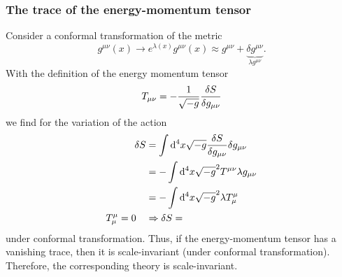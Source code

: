 \subsubsection{The trace of the energy-momentum tensor}
Consider a conformal transformation of the metric
\begin{equation}
	g^{\mu \nu}(x) \rightarrow e^{\lambda(x)} g^{\mu \nu}(x) \approx g^{\mu \nu} + \underbrace{\delta g^{\mu \nu}}_{\lambda g^{\mu\nu}}.
\end{equation}
With the definition of the energy momentum tensor
\begin{equation}
	T_{\mu \nu} = -  \frac{1}{\sqrt{-g}} \frac{\delta S}{\delta g_{\mu \nu}}
\end{equation}
we find for the variation of the action
\begin{align}
	\delta S &= \int \mathrm{d}^4 x \sqrt{-g} \frac{\delta S}{\delta g_{\mu \nu}} \delta g_{\mu \nu} \\
	&= - \int \mathrm{d}^4 x \sqrt{-g}^2 T^{\mu \nu} \lambda g_{\mu \nu} \\
	&= -\int \mathrm{d}^4 x \sqrt{-g}^2 \lambda T^\mu_\mu \\
	T^\mu_\mu = 0 \quad &\Rightarrow \delta S =
\end{align}
under conformal transformation. Thus, if the energy-momentum tensor has a vanishing trace, then it is
scale-invariant (under conformal transformation). Therefore, the corresponding theory is scale-invariant.



